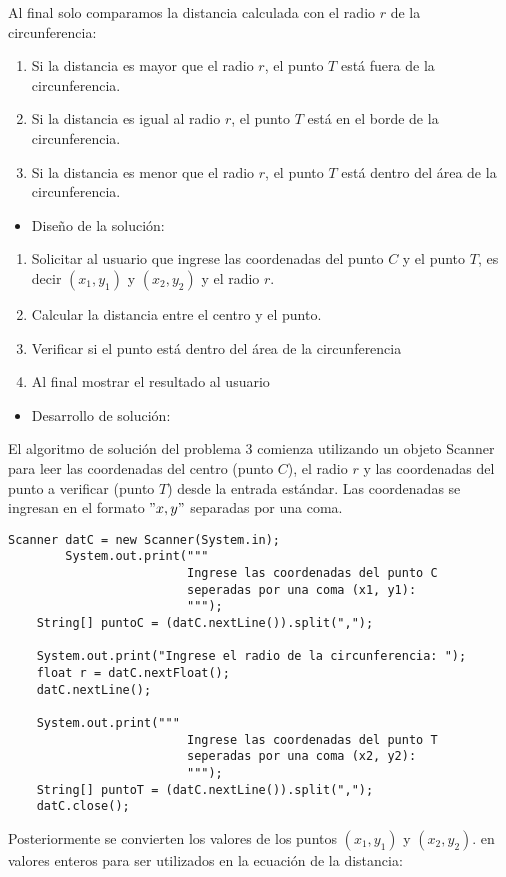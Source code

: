 \documentclass{IEEEcsmag}
\begin{document}
Al final solo comparamos la distancia calculada con el radio $r$ de la circunferencia:
\begin{enumerate}
\item Si la distancia es mayor que el radio $r$, el punto $T$ está fuera de la circunferencia.
\item Si la distancia es igual al radio $r$, el punto $T$ está en el borde de la circunferencia.
\item Si la distancia es menor que el radio $r$, el punto $T$ está dentro del área de la circunferencia.    
\end{enumerate}


\begin{itemize}
    \item Diseño de la solución:
\end{itemize}
\begin{enumerate} 
\item Solicitar al usuario que ingrese las coordenadas del punto $C$ y el punto $T$, es decir $(x_{1}, y_{1})$ y $(x_{2}, y_{2})$ y el radio $r$.
\item Calcular la distancia entre el centro y el punto.
\item Verificar si el punto está dentro del área de la circunferencia
\item Al final mostrar el resultado al usuario 
\end{enumerate}


\begin{itemize}
    \item Desarrollo de solución:
\end{itemize}
El algoritmo de solución del problema 3 comienza utilizando un objeto Scanner para leer las coordenadas del centro (punto $C$), el radio $r$ y las coordenadas del punto a verificar (punto $T$) desde la entrada estándar. Las coordenadas se ingresan en el formato $"x, y"$ separadas por una coma.
\begin{lstlisting}[style=javaStyle]
Scanner datC = new Scanner(System.in);
        System.out.print("""
                         Ingrese las coordenadas del punto C 
                         seperadas por una coma (x1, y1):
                         """);
    String[] puntoC = (datC.nextLine()).split(",");
        
    System.out.print("Ingrese el radio de la circunferencia: ");
    float r = datC.nextFloat();
    datC.nextLine();
    
    System.out.print("""
                         Ingrese las coordenadas del punto T
                         seperadas por una coma (x2, y2): 
                         """);
    String[] puntoT = (datC.nextLine()).split(",");
    datC.close();
\end{lstlisting}
Posteriormente se convierten los valores de los puntos $(x_{1}, y_{1})$ y $(x_{2}, y_{2})$. en valores enteros para ser utilizados  en la ecuación de la distancia:
\end{document}
